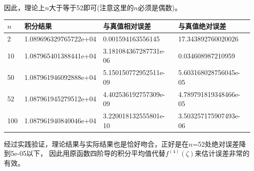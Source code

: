 \documentclass[a4paper,12pt]{ctexart}
\begin{document}
因此，理论上$n$大于等于52即可(注意这里的$n$必须是偶数)。
\begin{table}[H]
    \centering
    \begin{tabular}{llll}
        \hline
        $n$ & 积分结果              & 与真值相对误差        & 与真值绝对误差        \\ \hline
        2   & 1.089696329765722e+04 & 0.001594163556145     & 17.343892760020026    \\
        10  & 1.087965401388441e+04 & 3.181084367287731e-06 & 0.034608987210959     \\
        50  & 1.087961946092888e+04 & 5.150150772952511e-09 & 5.603168028756045e-05 \\
        52  & 1.087961945279512e+04 & 4.402536192757309e-09 & 4.789791819348466e-05 \\
        100 & 1.087961940840046e+04 & 3.220018132555801e-10 & 3.503257175907493e-06 \\
        \hline
    \end{tabular}
\end{table}
经过实践验证，理论结果与实际结果也是恰好吻合，正好是在$n$=52处绝对误差降到5e-05以下，
因此用原函数四阶导的积分平均值代替$f^{(4)}(\zeta)$来估计误差非常的有效。
\end{document}

